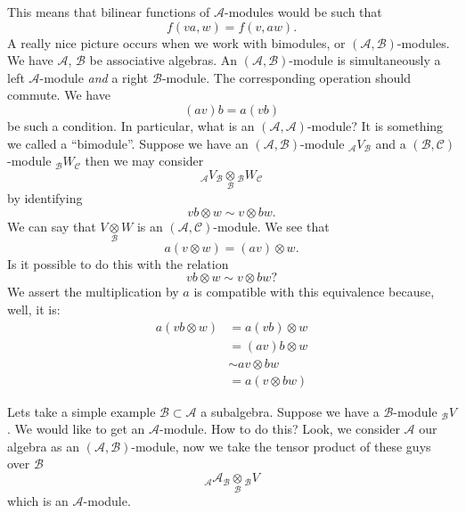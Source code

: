 This means that bilinear functions of $\mathscr{A}$-modules would
be such that
\begin{equation}
f(va,w)=f(v,aw).
\end{equation}
A really nice picture occurs when we work with bimodules, or
$(\mathscr{A},\mathscr{B})$-modules.  We have $\mathscr{A}$,
$\mathscr{B}$ be associative algebras. An
$(\mathscr{A},\mathscr{B})$-module is simultaneously a left
$\mathscr{A}$-module \emph{and} a right $\mathscr{B}$-module. The
corresponding operation should commute. We have
\begin{equation}
(av)b=a(vb)
\end{equation}
be such a condition. In particular, what is an
$(\mathscr{A},\mathscr{A})$-module? It is something we called a
``bimodule''. Suppose we have an
$(\mathscr{A},\mathscr{B})$-module
${}_{\mathscr{A}}V_{\mathscr{B}}$ and a
$(\mathscr{B},\mathscr{C})$-module
${}_{\mathscr{B}}W_{\mathscr{C}}$ then we may consider
\begin{equation}
{}_{\mathscr{A}}V_{\mathscr{B}}\mathop{\otimes}\limits_{\mathscr{B}}{}_{\mathscr{B}}W_{\mathscr{C}}
\end{equation}
by identifying
\begin{equation}
vb\otimes w\sim v\otimes bw.
\end{equation}
We can say that $V\mathop{\otimes}\limits_{\mathscr{B}}W$ is an
$(\mathscr{A},\mathscr{C})$-module. We see that
\begin{equation}
a(v\otimes w)=(av)\otimes w.
\end{equation}
Is it possible to do this with the relation
\begin{equation}
vb\otimes w\sim v\otimes bw?
\end{equation}
We assert the multiplication by $a$ is compatible with this
equivalence because, well, it is:
\begin{subequations}
\begin{align}
a(vb\otimes w) &= a(vb)\otimes w\\
&= (av)b\otimes w\\
&\sim av\otimes bw\\
&= a(v\otimes bw)
\end{align}
\end{subequations}

\begin{ex}
Lets take a simple example $\mathscr{B}\subset\mathscr{A}$ a
subalgebra. Suppose we have a $\mathscr{B}$-module
${}_{\mathscr{B}}V$. We would like to get an
$\mathscr{A}$-module. How to do this? Look, we consider
$\mathscr{A}$ our algebra as an
$(\mathscr{A},\mathscr{B})$-module, now we take the tensor
product of these guys over $\mathscr{B}$
\begin{equation}
{}_{\mathscr{A}}\mathscr{A}_{\mathscr{B}}\mathop{\otimes}\limits_{\mathscr{B}}{}_{\mathscr{B}}V
\end{equation}
which is an $\mathscr{A}$-module.
\end{ex}

